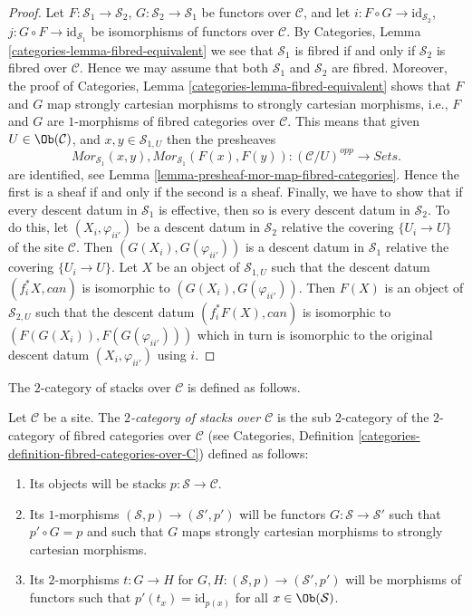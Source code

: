 \begin{proof}
Let $F : \mathcal{S}_1 \to \mathcal{S}_2$,
$G : \mathcal{S}_2 \to \mathcal{S}_1$ be functors over $\mathcal{C}$, and let
$i : F \circ G \to \text{id}_{\mathcal{S}_2}$,
$j : G \circ F \to \text{id}_{\mathcal{S}_1}$ be isomorphisms of
functors over $\mathcal{C}$. By
Categories, Lemma \ref{categories-lemma-fibred-equivalent}
we see that $\mathcal{S}_1$ is fibred if and only if $\mathcal{S}_2$
is fibred over $\mathcal{C}$. Hence we may assume that both
$\mathcal{S}_1$ and $\mathcal{S}_2$ are fibred. Moreover, the proof of
Categories, Lemma \ref{categories-lemma-fibred-equivalent}
shows that $F$ and $G$ map strongly cartesian morphisms to strongly
cartesian morphisms, i.e., $F$ and $G$ are $1$-morphisms of fibred
categories over $\mathcal{C}$. This means that given
$U \in \Ob(\mathcal{C})$, and $x, y \in \mathcal{S}_{1, U}$ then
the presheaves
$$
\mathit{Mor}_{\mathcal{S}_1}(x, y),
\mathit{Mor}_{\mathcal{S}_1}(F(x), F(y)) :
(\mathcal{C}/U)^{opp} \longrightarrow \textit{Sets}.
$$
are identified, see
Lemma \ref{lemma-presheaf-mor-map-fibred-categories}. Hence
the first is a sheaf if and only if the second is a sheaf.
Finally, we have to show that if every descent datum in $\mathcal{S}_1$
is effective, then so is every descent datum in $\mathcal{S}_2$.
To do this, let $(X_i, \varphi_{ii'})$ be a descent datum
in $\mathcal{S}_2$ relative the covering $\{U_i \to U\}$ of the site
$\mathcal{C}$. Then $(G(X_i), G(\varphi_{ii'}))$ is a descent datum
in $\mathcal{S}_1$ relative the covering $\{U_i \to U\}$.
Let $X$ be an object of $\mathcal{S}_{1, U}$ such that the
descent datum $(f_i^*X, can)$ is isomorphic to
$(G(X_i), G(\varphi_{ii'}))$. Then $F(X)$ is an object of $\mathcal{S}_{2, U}$
such that the descent datum $(f_i^*F(X), can)$ is isomorphic to
$(F(G(X_i)), F(G(\varphi_{ii'})))$ which in turn is isomorphic to
the original descent datum $(X_i, \varphi_{ii'})$ using $i$.
\end{proof}

\noindent
The $2$-category of stacks over $\mathcal{C}$
is defined as follows.

\begin{definition}
\label{definition-stacks-over-C}
Let $\mathcal{C}$ be a site.
The {\it $2$-category of stacks over $\mathcal{C}$}
is the sub $2$-category of the $2$-category of fibred categories
over $\mathcal{C}$ (see
Categories, Definition \ref{categories-definition-fibred-categories-over-C})
defined as follows:
\begin{enumerate}
\item Its objects will be stacks $p : \mathcal{S} \to \mathcal{C}$.
\item Its $1$-morphisms $(\mathcal{S}, p) \to (\mathcal{S}', p')$
will be functors $G : \mathcal{S} \to \mathcal{S}'$ such that
$p' \circ G = p$ and such that $G$ maps strongly cartesian
morphisms to strongly cartesian morphisms.
\item Its $2$-morphisms $t : G \to H$ for
$G, H : (\mathcal{S}, p) \to (\mathcal{S}', p')$
will be morphisms of functors
such that $p'(t_x) = \text{id}_{p(x)}$
for all $x \in \Ob(\mathcal{S})$.
\end{enumerate}
\end{definition}

